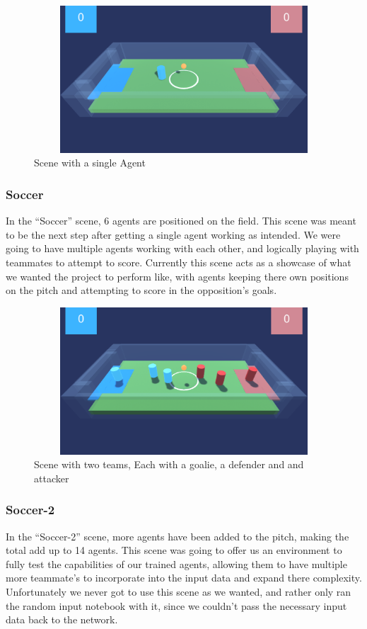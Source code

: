 \begin{figure}[H]
    \centering
    \includegraphics[width=115mm, height=55mm]{img/GameScreen3.png}
    \caption{Scene with a single Agent}
    \label{fig:socran}
\end{figure}

\subsubsection{Soccer}
In the “Soccer” scene, 6 agents are positioned on the field. This scene was meant to be the next step after getting a single agent working as intended. We were going to have multiple agents working with each other, and logically playing with teammates to attempt to score. Currently this scene acts as a showcase of what we wanted the project to perform like, with agents keeping there own positions on the pitch and attempting to score in the opposition's goals.

\begin{figure}[H]
    \centering
    \includegraphics[width=115mm, height=55mm]{img/GameScreen1.png}
    \caption{Scene with two teams, Each with a goalie, a defender and and attacker}
    \label{fig:soc}
\end{figure}

\subsubsection{Soccer-2}
In the “Soccer-2” scene, more agents have been added to the pitch, making the total add up to 14 agents. This scene was going to offer us an environment to fully test the capabilities of our trained agents, allowing them to have multiple more teammate's to incorporate into the input data and expand there complexity. Unfortunately we never got to use this scene as we wanted, and rather only ran the random input notebook with it, since we couldn’t pass the necessary input data back to the network.

